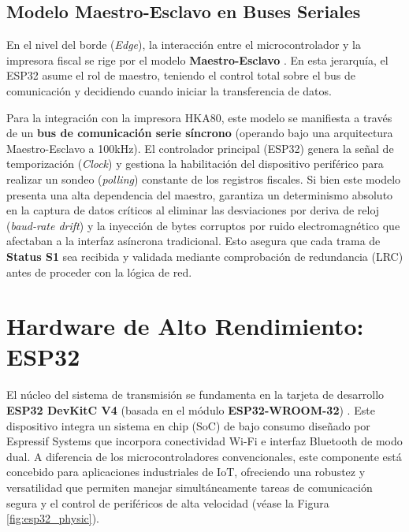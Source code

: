 \subsection{Modelo Maestro-Esclavo en Buses Seriales}

\par En el nivel del borde (\textit{Edge}), la interacción entre el microcontrolador y la impresora fiscal se rige por el modelo \textbf{Maestro-Esclavo} \cite{TheFactoryHKA_Manual_Protocolos}. En esta jerarquía, el ESP32 asume el rol de maestro, teniendo el control total sobre el bus de comunicación y decidiendo cuando iniciar la transferencia de datos.\\

\par Para la integración con la impresora HKA80, este modelo se manifiesta a través de un \textbf{bus de comunicación serie síncrono} (operando bajo una arquitectura Maestro-Esclavo a 100kHz). El controlador principal (ESP32) genera la señal de temporización (\textit{Clock}) y gestiona la habilitación del dispositivo periférico para realizar un sondeo (\textit{polling}) constante de los registros fiscales. Si bien este modelo presenta una alta dependencia del maestro, garantiza un determinismo absoluto en la captura de datos críticos al eliminar las desviaciones por deriva de reloj (\textit{baud-rate drift}) y la inyección de bytes corruptos por ruido electromagnético que afectaban a la interfaz asíncrona tradicional. Esto asegura que cada trama de \textbf{Status S1} sea recibida y validada mediante comprobación de redundancia (LRC) antes de proceder con la lógica de red.

\section{Hardware de Alto Rendimiento: ESP32}

\par El núcleo del sistema de transmisión se fundamenta en la tarjeta de desarrollo \textbf{ESP32 DevKitC V4} (basada en el módulo \textbf{ESP32-WROOM-32}) \cite{Espressif_ESP32_Datasheet}. Este dispositivo integra un sistema en chip (SoC) de bajo consumo diseñado por Espressif Systems que incorpora conectividad Wi-Fi e interfaz Bluetooth de modo dual. A diferencia de los microcontroladores convencionales, este componente está concebido para aplicaciones industriales de IoT, ofreciendo una robustez y versatilidad que permiten manejar simultáneamente tareas de comunicación segura y el control de periféricos de alta velocidad (véase la Figura \ref{fig:esp32_physic}).

